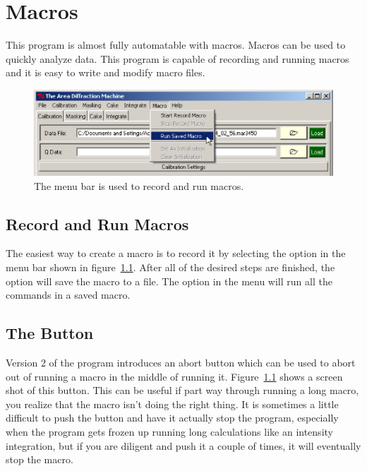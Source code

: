 \chapter{Macros}

This program is almost fully automatable with macros. Macros
can be used to quickly analyze data. 
This program is capable of recording and running macros and
it is easy to write and modify macro files. 

\begin{figure}
    \centering
    \includegraphics[scale=.75]{figures/macro.eps}
    \caption{The  menu bar is used to
    record and run macros.}
    \label{macro_figure}
\end{figure}

\section{Record and Run Macros}

The easiest way to create a macro is to record it by selecting 
the  
option in the  menu 
bar shown in  figure~\ref{macro_figure}. 
After all of the desired steps are finished, 
the  option will save the macro to
a file. The  option in the 
menu will run all the commands in a saved macro. 

\section{The  Button}

Version 2 of the program introduces an abort button which
can be used to abort out of running a macro in the middle
of running it. Figure~\ref{macro_figure} shows a screen shot
of this button. This can be useful if part way through
running a long macro, you realize that the macro isn't
doing the right thing. It is sometimes a little difficult to 
push the button and have it actually stop the program, especially 
when the program gets frozen up running long calculations like an 
intensity integration, but if you are diligent and push it a couple 
of times, it will eventually stop the macro. 

